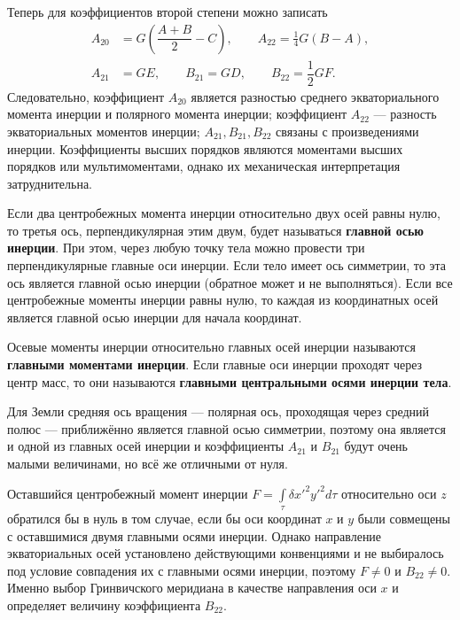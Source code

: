 \documentclass[11pt, a4paper,addpoints]{exam}
\theoremstyle{remark}
\begin{document}
    Теперь для коэффициентов второй степени можно записать
    \begin{align*}
        A_{20} &= G\left( \dfrac{A + B}{2} - C \right), \qquad
        A_{22} = \frac{1}{4}G\left( B - A \right), \\
        A_{21} &= GE,  \qquad
        B_{21} = GD,  \qquad
        B_{22} = \dfrac{1}{2}GF.
    \end{align*}
    Следовательно, коэффициент $A_{20}$ является разностью среднего экваториального момента инерции
    и полярного момента инерции; коэффициент $A_{22}$ --- разность экваториальных моментов инерции;
    $A_{21}, B_{21}, B_{22}$ связаны с произведениями инерции. Коэффициенты высших порядков являются
    моментами высших порядков или мультимоментами, однако их механическая интерпретация
    затруднительна.

    Если два центробежных момента инерции относительно двух осей равны нулю, то третья ось,
    перпендикулярная этим двум, будет называться \textbf{главной осью инерции}. При этом, через
    любую точку тела можно провести три перпендикулярные главные оси инерции. Если тело имеет ось
    симметрии, то эта ось является главной осью инерции (обратное может и не выполняться).
    Если все центробежные моменты инерции равны нулю, то каждая из координатных осей является
    главной осью инерции для начала координат.

    Осевые моменты инерции относительно главных осей инерции называются \textbf{главными моментами
    инерции}. Если главные оси инерции проходят через центр масс, то они называются \textbf{главными
    центральными осями инерции тела}.

    Для Земли средняя ось вращения --- полярная ось, проходящая через средний полюс --- 
    приближённо является главной осью симметрии, поэтому она является и одной из главных осей
    инерции и коэффициенты $A_{21}$ и $B_{21}$ будут очень малыми величинами, но всё же отличными от
    нуля.

    Оставшийся центробежный момент инерции $F = \int\limits_\tau \delta x'^2 y'^2 d\tau$
    относительно оси $z$ обратился бы  в нуль  в том случае, если бы оси координат $x$ и $y$
    были совмещены с оставшимися двумя главными осями инерции. Однако направление экваториальных осей
    установлено действующими конвенциями и не выбиралось под условие совпадения их с главными осями
    инерции, поэтому $F \neq 0$ и $B_{22} \neq 0$. Именно выбор Гринвичского меридиана в качестве
    направления оси $x$ и определяет величину коэффициента $B_{22}$.
\end{document}
